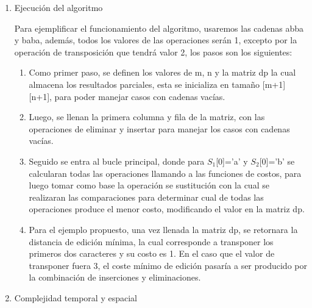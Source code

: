 \begin{enumerate}[1)]
\begin{algorithm}[H]
{{{                
            }
            }

            \;
    }

\end{algorithm}

\item Ejecución del algoritmo

Para ejemplificar el funcionamiento del algoritmo, usaremos las cadenas
abba y baba, además, todos los valores de las operaciones serán 1, excepto
por la operación de transposición que tendrá valor 2, los pasos son los siguientes:

\begin{enumerate}[1)]
    \item Como primer paso, se definen los valores de m, n y la matriz dp la cual almacena
    los resultados parciales, esta se inicializa en tamaño [m+1][n+1], para poder manejar
    casos con cadenas vacías.

\item Luego, se llenan la primera columna y fila de la matriz, con las operaciones
de eliminar y insertar para manejar los casos con cadenas vacías.

\item Seguido se entra al bucle principal, donde para $S_1$[0]='a' y $S_2$[0]='b' se calcularan
todas las operaciones llamando a las funciones de costos, para luego tomar como base la operación se sustitución con la cual
se realizaran las comparaciones para determinar cual de todas las operaciones produce el menor
costo, modificando el valor en la matriz dp.

\item Para el ejemplo propuesto, una vez llenada la matriz dp, se retornara la distancia
de edición mínima, la cual corresponde a transponer los primeros dos caracteres y su costo es 1. En el caso que el valor de transponer fuera 3, el coste mínimo de edición
pasaría a ser producido por la combinación de inserciones y eliminaciones.

\end{enumerate}


    \item Complejidad temporal y espacial
    

\end{enumerate}
